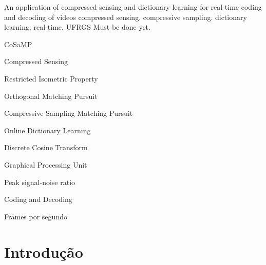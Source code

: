 \documentclass[cic,tc]{iiufrgs}
\begin{document}
\begin{englishabstract}{An application of compressed sensing and dictionary learning for real-time coding and decoding of videos}
    {compressed sensing. compressive sampling. dictionary learning. real-time. UFRGS}
    Must be done yet.
\end{englishabstract}

\listoffigures

\listoftables

\begin{listofabbrv}{CoSaMP}
    \item[CS] Compressed Sensing
    \item[RIP] Restricted Isometric Property
    \item[OMP] Orthogonal Matching Pursuit
    \item[CoSaMP] Compressive Sampling Matching Pursuit 
    \item[ODL] Online Dictionary Learning 
    \item[DCT] Discrete Cosine Transform 
    \item[GPU] Graphical Processing Unit
    \item[PSNR] Peak signal-noise ratio 
    \item[CoDec] Coding and Decoding  
    \item[FPS] Frames por segundo
\end{listofabbrv}


\tableofcontents


\chapter{Introdução}
\end{document}
